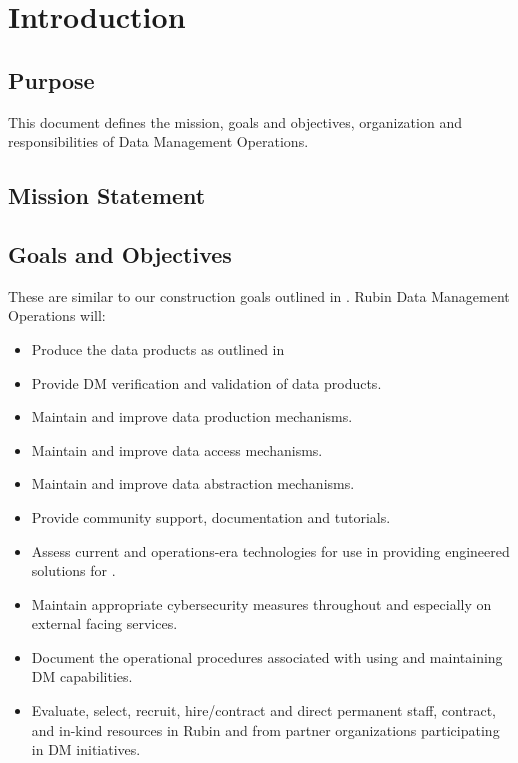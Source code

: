 \section {Introduction}\label{sec:intro}
\subsection{Purpose}
This document defines the mission, goals and objectives, organization and responsibilities of
 \VRO Data Management Operations.

\subsection{Mission Statement}


\subsection{Goals and Objectives}
These are similar to our construction goals outlined in .
Rubin Data Management Operations will:
\begin{itemize}
\item Produce the data products as outlined in 
\item Provide DM verification and validation of data products.
\item Maintain and improve data production mechanisms.
\item Maintain and improve data access mechanisms.
\item Maintain and improve data abstraction mechanisms.
\item Provide community support, documentation and tutorials.
\item Assess current and operations-era technologies for use in providing engineered solutions for \VRO.
\item Maintain appropriate cybersecurity measures throughout \VRO and especially on external facing services.
\item Document the operational procedures associated with using and maintaining DM capabilities.
\item Evaluate, select, recruit, hire/contract and direct permanent staff, contract, and in-kind resources in Rubin and from partner organizations participating in DM initiatives.

\end{itemize}


